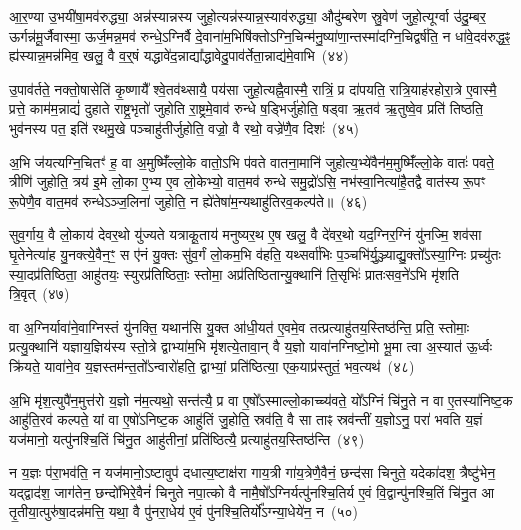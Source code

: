 आ॒र॒ण्या उ॒भयी॑षा॒मव॑रुद्ध्या॒ अन्न॑स्यान्नस्य जुहो॒त्यन्न॑स्यान्न॒स्याव॑रुद्ध्या॒ औदु॑म्बरेण स्रु॒वेण॑ जुहो॒त्यूर्ग्वा उ॑दु॒म्बर॒ ऊर्गन्न॑मू॒र्जैवास्मा॒ ऊर्ज॒मन्न॒मव॑ रुन्धे॒\-ऽग्निर्वै दे॒वाना॑म॒भिषि॑क्तो\-ऽग्नि॒चिन्म॑नु॒ष्या॑णा॒न्तस्मा॑दग्नि॒चिद्वर्\mbox{}ष॑ति॒ न धा॑वे॒दव॑रुद्ध॒ꣴ॒ ह्य॑स्यान्न॒मन्न॑मिव॒ खलु॒ वै व॒र्॒\mbox{}षं यद्धावे॑द॒न्नाद्या᳚द्धावेदु॒पाव॑र्तेता॒न्नाद्य॑मे॒वाभि~(४४)

उ॒पाव॑र्तते॒ नक्तो॒षासेति॑ कृ॒ष्णायै᳚ श्वे॒तव॑थ्सायै॒ पय॑सा जुहो॒त्यह्नै॒वास्मै॒ रात्रिं॒ प्र दा॑पयति॒ रात्रि॒याह॑रहोरा॒त्रे ए॒वास्मै॒ प्रत्ते॒ काम॑म॒न्नाद्यं॑ दुहाते राष्ट्र॒भृतो॑ जुहोति रा॒ष्ट्रमे॒वाव॑ रुन्धे ष॒ड्भिर्जु॑होति॒ षड्वा ऋ॒तव॑ ऋ॒तुष्वे॒व प्रति॑ तिष्ठति॒ भुव॑नस्य पत॒ इति॑ रथमु॒खे पञ्चाहु॑तीर्जुहोति॒ वज्रो॒ वै रथो॒ वज्रे॑णै॒व दिशः॑~(४५)

अ॒भि ज॑यत्यग्नि॒चितꣳ॑ ह॒ वा अ॒मुष्मिँ॑ल्लो॒के वातो॒\-ऽभि प॑वते वातना॒मानि॑ जुहोत्य॒भ्ये॑वैन॑म॒मुष्मिँ॑ल्लो॒के वातः॑ पवते॒ त्रीणि॑ जुहोति॒ त्रय॑ इ॒मे लो॒का ए॒भ्य ए॒व लो॒केभ्यो॒ वात॒मव॑ रुन्धे समु॒द्रो॑\-ऽसि॒ नभ॑स्वा॒नित्या॑है॒तद्वै वात॑स्य रू॒पꣳ रू॒पेणै॒व वात॒मव॑ रुन्धे\-ऽञ्ज॒लिना॑ जुहोति॒ न ह्ये॑तेषा॑म॒न्यथाहु॑तिरव॒कल्प॑ते॥~(४६)

{\anuvakamend[{ओष॑धयः स॒प्ताभि दिशो॒\-ऽन्यथा॒ द्वे च॑}]}%

सुव॒र्गाय॒ वै लो॒काय॑ देवर॒थो यु॑ज्यते यत्राकू॒ताय॑ मनुष्यर॒थ ए॒ष खलु॒ वै दे॑वर॒थो यद॒ग्निर॒ग्निं यु॑नज्मि॒ शव॑सा घृ॒तेनेत्या॑ह यु॒नक्त्ये॒वैन॒ꣳ॒ स ए॑नं यु॒क्तः सु॑व॒र्गं लो॒कम॒भि व॑हति॒ यथ्सर्वा॑भिः प॒ञ्चभि॑र्यु॒ञ्ज्याद्यु॒क्तो᳚\-ऽस्या॒ग्निः प्रच्यु॑तः स्या॒दप्र॑तिष्ठिता॒ आहु॑तयः॒ स्युरप्र॑तिष्ठिताः॒ स्तोमा॒ अप्र॑तिष्ठितान्यु॒क्थानि॑ ति॒सृभिः॑ प्रातःसव॒ने॑\-ऽभि मृ॑शति त्रि॒वृत्~(४७)

वा अ॒ग्निर्यावा॑ने॒वाग्निस्तं यु॑नक्ति॒ यथान॑सि यु॒क्त आ॑धी॒यत॑ ए॒वमे॒व तत्प्रत्याहु॑तय॒स्तिष्ठ॑न्ति॒ प्रति॒ स्तोमाः॒ प्रत्यु॒क्थानि॑ यज्ञाय॒ज्ञिय॑स्य स्तो॒त्रे द्वाभ्या॑म॒भि मृ॑शत्ये॒तावा॒न् वै य॒ज्ञो यावा॑नग्निष्टो॒मो भू॒मा त्वा अ॒स्यात॑ ऊ॒र्ध्वः क्रि॑यते॒ यावा॑ने॒व य॒ज्ञस्तम॑न्त॒तो᳚\-ऽन्वारो॑हति॒ द्वाभ्यां॒ प्रति॑ष्ठित्या॒ एक॒याप्र॑स्तुतं॒ भव॒त्यथ॑~(४८)

अ॒भि मृ॑श॒त्युपै॑न॒मुत्त॑रो य॒ज्ञो न॑म॒त्यथो॒ सन्त॑त्यै॒ प्र वा ए॒षो᳚\-ऽस्माल्लो॒काच्च्य॑वते॒ यो᳚\-ऽग्निं चि॑नु॒ते न वा ए॒तस्या॑निष्ट॒क आहु॑ति॒रव॑ कल्पते॒ यां वा ए॒षो॑\-ऽनिष्ट॒क आहु॑तिं जु॒होति॒ स्रव॑ति॒ वै सा ताꣴ स्रव॑न्तीं य॒ज्ञो\-ऽनु॒ परा॑ भवति य॒ज्ञं यज॑मानो॒ यत्पु॑नश्चि॒तिं चि॑नु॒त आहु॑तीनां॒ प्रति॑ष्ठित्यै॒ प्रत्याहु॑तय॒स्तिष्ठ॑न्ति~(४९)

न य॒ज्ञः प॑रा॒भव॑ति॒ न यज॑मानो॒\-ऽष्टावुप॑ दधात्य॒ष्टाक्ष॑रा गाय॒त्री गा॑य॒त्रेणै॒वैनं॒ छन्द॑सा चिनुते॒ यदेका॑\-दश॒ त्रैष्टु॑भेन॒ यद्द्वाद॑श॒ जाग॑तेन॒ छन्दो॑भिरे॒वैनं॑ चिनुते नपा॒त्को वै नामै॒षो᳚\-ऽग्निर्यत्पु॑नश्चि॒तिर्य ए॒वं वि॒द्वान्पु॑नश्चि॒तिं चि॑नु॒त आ तृ॒तीया॒त्पुरु॑षा॒दन्न॑मत्ति॒ यथा॒ वै पु॑नरा॒धेय॑ ए॒वं पु॑नश्चि॒तिर्यो᳚\-ऽग्न्या॒धेये॑न॒ न~(५०)

